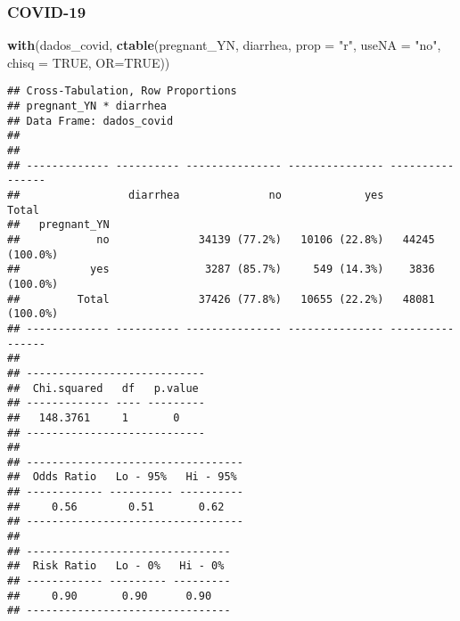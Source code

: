 \documentclass[
]{article}
\newenvironment{Shaded}{\begin{snugshade}}{\end{snugshade}}
\newcommand{\DataTypeTok}[1]{\textcolor[rgb]{0.13,0.29,0.53}{#1}}
\newcommand{\DecValTok}[1]{\textcolor[rgb]{0.00,0.00,0.81}{#1}}
\newcommand{\KeywordTok}[1]{\textcolor[rgb]{0.13,0.29,0.53}{\textbf{#1}}}
\newcommand{\NormalTok}[1]{#1}
\newcommand{\OperatorTok}[1]{\textcolor[rgb]{0.81,0.36,0.00}{\textbf{#1}}}
\newcommand{\OtherTok}[1]{\textcolor[rgb]{0.56,0.35,0.01}{#1}}
\newcommand{\StringTok}[1]{\textcolor[rgb]{0.31,0.60,0.02}{#1}}
\begin{document}
\hypertarget{covid-19-15}{%
\subsubsection{COVID-19}\label{covid-19-15}}

\begin{Shaded}
\end{Shaded}

\begin{Shaded}
\begin{Highlighting}[]
\KeywordTok{with}\NormalTok{(dados_covid, }\KeywordTok{ctable}\NormalTok{(pregnant_YN, diarrhea, }\DataTypeTok{prop =} \StringTok{"r"}\NormalTok{, }\DataTypeTok{useNA =} \StringTok{"no"}\NormalTok{, }\DataTypeTok{chisq =} \OtherTok{TRUE}\NormalTok{, }\DataTypeTok{OR=}\OtherTok{TRUE}\NormalTok{))}
\end{Highlighting}
\end{Shaded}

\begin{verbatim}
## Cross-Tabulation, Row Proportions  
## pregnant_YN * diarrhea  
## Data Frame: dados_covid  
## 
## 
## ------------- ---------- --------------- --------------- ----------------
##                 diarrhea              no             yes            Total
##   pregnant_YN                                                            
##            no              34139 (77.2%)   10106 (22.8%)   44245 (100.0%)
##           yes               3287 (85.7%)     549 (14.3%)    3836 (100.0%)
##         Total              37426 (77.8%)   10655 (22.2%)   48081 (100.0%)
## ------------- ---------- --------------- --------------- ----------------
## 
## ----------------------------
##  Chi.squared   df   p.value 
## ------------- ---- ---------
##   148.3761     1       0    
## ----------------------------
## 
## ----------------------------------
##  Odds Ratio   Lo - 95%   Hi - 95% 
## ------------ ---------- ----------
##     0.56        0.51       0.62   
## ----------------------------------
## 
## --------------------------------
##  Risk Ratio   Lo - 0%   Hi - 0% 
## ------------ --------- ---------
##     0.90       0.90      0.90   
## --------------------------------
\end{verbatim}
\end{document}
